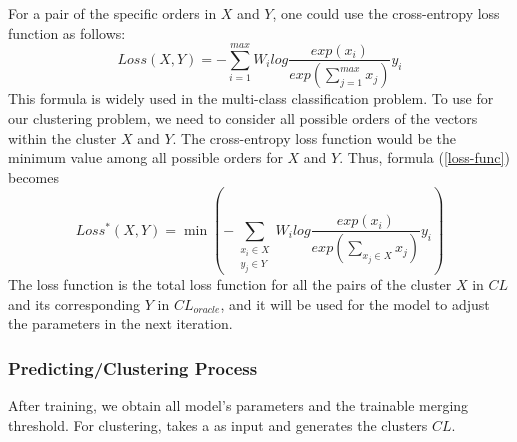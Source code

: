 For a pair of the specific orders in $X$ and $Y$, one could use
the cross-entropy loss function as follows:
\begin{equation}\label{loss-func}
	Loss(X,Y) = -\sum^{max}_{i=1}W_ilog\frac{exp(x_i)}{exp(\sum^{max}_{j=1}x_j)}y_i
\end{equation}
This formula is widely used in the multi-class classification problem.
To use for our clustering problem, we need to consider all possible
orders of the vectors within the cluster $X$ and $Y$. The
cross-entropy loss function would be the minimum value among all
possible orders for $X$ and $Y$. Thus, formula (\ref{loss-func})
becomes
\begin{equation}\label{new-func}
	Loss^{*}(X,Y)= \min (-\sum_{\substack{x_i\in X\\ y_j 
			\in Y}}W_ilog\frac{exp(x_i)}{exp(\sum\limits_{x_j \in X}x_j)}y_i)
\end{equation}
The loss function is the total loss function for all the pairs of the
cluster $X$ in $CL$ and its corresponding $Y$ in $CL_{oracle}$, and it
will be used for the model to adjust the parameters in the next
iteration.

\subsubsection*{Predicting/Clustering Process}
After training, we obtain all model's parameters and the trainable
merging threshold. For clustering, {\tool} takes a {\mvpdg} as input
and generates the clusters $CL$.

